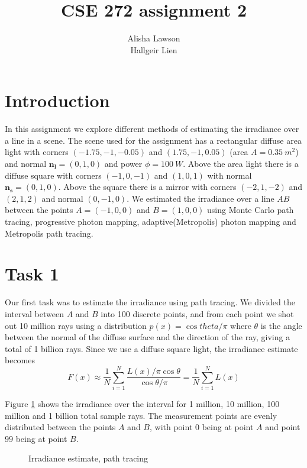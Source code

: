 \documentclass{article} %
\title{CSE 272 assignment 2}
\author{Alisha Lawson\\Hallgeir Lien}
\date{}
\begin{document}
\maketitle
\newpage

\section*{Introduction}
In this assignment we explore different methods of estimating the irradiance over a line in a scene. The scene used for the assignment has a rectangular diffuse area light with corners $(-1.75,-1,-0.05)$ and $(1.75,-1,0.05)$ (area $A=0.35\ m^2$) and normal $\mathbf{n_l}=(0,1,0)$ and power $\phi=100\ W$. Above the area light there is a diffuse square with corners $(-1,0,-1)$ and $(1,0,1)$ with normal $\mathbf{n_s}=(0,1,0)$. Above the square there is a mirror with corners $(-2,1,-2)$ and $(2,1,2)$ and normal $(0,-1,0)$. We estimated the irradiance over a line $AB$ between the points $A=(-1,0,0)$ and $B=(1,0,0)$ using Monte Carlo path tracing, progressive photon mapping, adaptive(Metropolis) photon mapping and Metropolis path tracing. 

\section*{Task 1}
Our first task was to estimate the irradiance using path tracing. We divided the interval between $A$ and $B$ into 100 discrete points, and from each point we shot out 10 million rays using a distribution $p(x)=\cos theta / \pi$ where $\theta$ is the angle between the normal of the diffuse surface and the direction of the ray, giving a total of 1 billion rays. Since we use a diffuse square light, the irradiance estimate becomes
$$
F(x) \approx \frac{1}{N} \sum_{i=1}^N \frac{L(x)/\pi \cos \theta}{\cos \theta / \pi} = \frac{1}{N} \sum_{i=1}^N L(x)
$$

Figure \ref{fig:pathtracing} shows the irradiance over the interval for 1 million, 10 million, 100 million and 1 billion total sample rays. The measurement points are evenly distributed between the points $A$ and $B$, with point $0$ being at point $A$ and point $99$ being at point $B$.
\begin{figure}[H]
    \caption{Irradiance estimate, path tracing}
\label{fig:pathtracing}
\end{figure}
\end{document}
